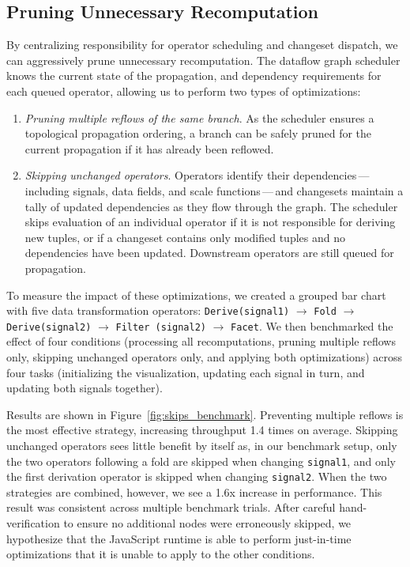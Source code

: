 \subsection{Pruning Unnecessary Recomputation}
\label{sec:pruning}

By centralizing responsibility for operator scheduling and changeset dispatch,
we can aggressively prune unnecessary recomputation. The dataflow graph
scheduler knows the current state of the propagation, and dependency
requirements for each queued operator, allowing us to perform two types of
optimizations:

\begin{enumerate}
  \item \emph{Pruning multiple reflows of the same branch}. As the scheduler
  ensures a topological propagation ordering, a branch can be safely pruned for
  the current propagation if it has already been reflowed.

  \item \emph{Skipping unchanged operators}. Operators identify their
dependencies\,---\,including signals, data fields, and scale functions\,---\,and
changesets maintain a tally of updated dependencies as they flow through the
graph. The scheduler skips evaluation of an individual operator if it is not
responsible for deriving new tuples, or if a changeset contains only modified
tuples and no dependencies have been updated. Downstream operators are still
queued for propagation.
\end{enumerate}

To measure the impact of these optimizations, we created a grouped bar chart
with five data transformation operators: \texttt{Derive(signal1)} $\rightarrow$
\texttt{Fold} $\rightarrow$ \texttt{Derive(signal2)} $\rightarrow$
\texttt{Filter (signal2)} $\rightarrow$ \texttt{Facet}.  We then benchmarked the
effect of four conditions (processing all recomputations, pruning multiple
reflows only, skipping unchanged operators only, and applying both
optimizations) across four tasks (initializing the visualization, updating each
signal in turn, and updating both signals together).

Results are shown in Figure~\ref{fig:skips_benchmark}. Preventing multiple
reflows is the most effective strategy, increasing throughput 1.4 times on
average. Skipping unchanged operators sees little benefit by itself as, in our
benchmark setup, only the two operators following a fold are skipped when
changing \texttt{signal1}, and only the first derivation operator is skipped
when changing \texttt{signal2}. When the two strategies are combined, however,
we see a 1.6x increase in performance. This result was consistent across
multiple benchmark trials. After careful hand-verification to ensure no
additional nodes were erroneously skipped, we hypothesize that the JavaScript
runtime is able to perform just-in-time optimizations that it is unable to apply
to the other conditions.

